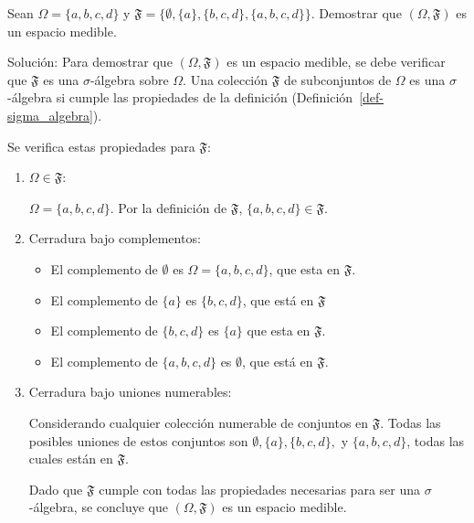 \documentclass[
  us-letterpaper,
]{scrreprt}
\theoremstyle{plain}
\theoremstyle{plain}
\theoremstyle{definition}
\theoremstyle{remark}
\begin{document}
\begin{tcolorbox}[enhanced jigsaw, titlerule=0mm, opacityback=0, coltitle=black, bottomrule=.15mm, colbacktitle=quarto-callout-caution-color!10!white, toprule=.15mm, colback=white, arc=.35mm, colframe=quarto-callout-caution-color-frame, leftrule=.75mm, bottomtitle=1mm, left=2mm, toptitle=1mm, opacitybacktitle=0.6, breakable, title={Ejemplo (\textbf{\emph{Espacio medible}})}, rightrule=.15mm]

Sean \(\Omega = \{a, b, c, d \}\) y
\(\mathfrak{F} = \{ \emptyset, \{a\}, \{ b, c, d\}, \{a, b, c, d\}\}\).
Demostrar que \((\Omega, \mathfrak{F})\) es un espacio medible.

Solución: Para demostrar que \((\Omega,\mathfrak{F})\) es un espacio
medible, se debe verificar que \(\mathfrak{F}\) es una
\(\sigma\)-álgebra sobre \(\Omega\). Una colección \(\mathfrak{F}\) de
subconjuntos de \(\Omega\) es una \(\sigma\)-álgebra si cumple las
propiedades de la definición (Definición~\ref{def-sigma_algebra}).

Se verifica estas propiedades para \(\mathfrak{F}\):

\begin{enumerate}
\def\labelenumi{\arabic{enumi}.}
\item
  \(\Omega \in \mathfrak{F}\):

  \(\Omega = \{ a,b,c,d\}\). Por la definición de \(\mathfrak{F}\),
  \(\{a,b,c,d\} \in \mathfrak{F}\).
\item
  Cerradura bajo complementos:

  \begin{itemize}
  \item
    El complemento de \(\emptyset\) es \(\Omega = \{a,b,c,d\}\), que
    esta en \(\mathfrak{F}\).
  \item
    El complemento de \(\{a\}\) es \(\{b,c,d\}\), que está en
    \(\mathfrak{F}\)
  \item
    El complemento de \(\{b,c,d\}\) es \(\{a\}\) que esta en
    \(\mathfrak{F}\).
  \item
    El complemento de \(\{a,b,c,d\}\) es \(\emptyset\), que está en
    \(\mathfrak{F}\).
  \end{itemize}
\item
  Cerradura bajo uniones numerables:

  Considerando cualquier colección numerable de conjuntos en
  \(\mathfrak{F}\). Todas las posibles uniones de estos conjuntos son
  \(\emptyset, \{a\}, \{b,c, d\},\) y \(\{a,b,c, d\}\), todas las cuales
  están en \(\mathfrak{F}\).

  Dado que \(\mathfrak{F}\) cumple con todas las propiedades necesarias
  para ser una \(\sigma\)-álgebra, se concluye que
  \((\Omega, \mathfrak{F})\) es un espacio medible.
\end{enumerate}

\end{tcolorbox}
\end{document}
